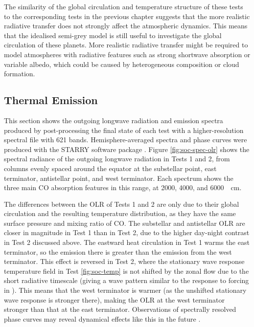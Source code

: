 The similarity of the global circulation and temperature structure of these tests to the corresponding tests in the previous chapter suggests that the more realistic radiative transfer does not strongly affect the atmospheric dynamics. This means that the idealised semi-grey model is still useful to investigate the global circulation of these planets. More realistic radiative transfer might be required to model atmospheres with radiative features such as strong shortwave absorption or variable albedo, which could be caused by heterogeneous composition or cloud formation.



\subsection{Thermal Emission}

This section shows the outgoing longwave radiation and emission spectra produced by post-processing the final state of each test with a higher-resolution spectral file with 621 bands. Hemisphere-averaged spectra and phase curves were produced with the STARRY software package \citep{luger2019starry}. Figure \ref{fig:soc-spec-olr} shows the spectral radiance of the outgoing longwave radiation in Tests 1 and 2, from columns evenly spaced around the equator at the substellar point, east terminator, antistellar point, and west terminator. Each spectrum shows the three main CO absorption features in this range, at 2000, 4000, and \SI{6000}{\per\centi\metre}.

The differences between the OLR of Tests 1 and 2 are only due to their global circulation and the resulting temperature distribution, as they have the same surface pressure and mixing ratio of CO. The substellar and antistellar OLR are closer in magnitude in Test 1 than in Test 2, due to the higher day-night contrast in Test 2 discussed above. The eastward heat circulation in Test 1 warms the east terminator, so the emission there is greater than the emission from the west terminator. This effect is reversed in Test 2, where the stationary wave response temperature field in Test \ref{fig:soc-temp} is not shifted by the zonal flow due to the short radiative timescale (giving a wave pattern similar to the response to forcing in \citet{matsuno1966quasi}). This means that the west terminator is warmer (as the unshifted stationary wave response is stronger there), making the OLR at the west terminator stronger than that at the east terminator. Observations of spectrally resolved phase curves may reveal dynamical effects like this in the future \citep{stevenson2014thermal}.


